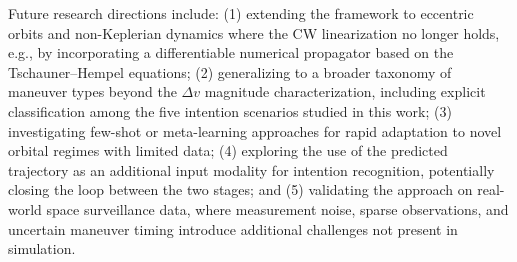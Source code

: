 \documentclass[a4paper,fleqn]{cas-dc}
\begin{document}
Future research directions include: (1) extending the framework to eccentric orbits and non-Keplerian dynamics where the CW linearization no longer holds, e.g., by incorporating a differentiable numerical propagator based on the Tschauner--Hempel equations; (2) generalizing to a broader taxonomy of maneuver types beyond the $\Delta v$ magnitude characterization, including explicit classification among the five intention scenarios studied in this work; (3) investigating few-shot or meta-learning approaches for rapid adaptation to novel orbital regimes with limited data; (4) exploring the use of the predicted trajectory as an additional input modality for intention recognition, potentially closing the loop between the two stages; and (5) validating the approach on real-world space surveillance data, where measurement noise, sparse observations, and uncertain maneuver timing introduce additional challenges not present in simulation.


\printcredits

%





\end{document}
